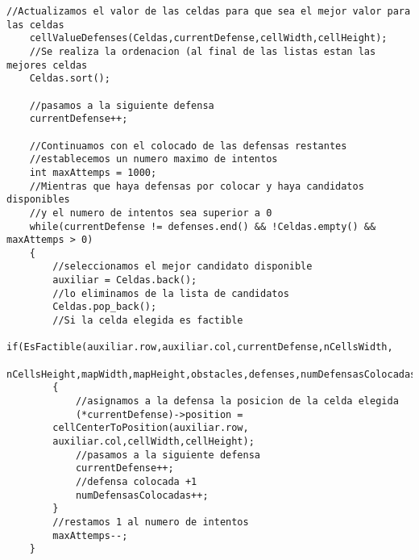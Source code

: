 \begin{lstlisting}[frame=single,basicstyle=\tiny,title={Voraz total}]
	//Actualizamos el valor de las celdas para que sea el mejor valor para las celdas
	cellValueDefenses(Celdas,currentDefense,cellWidth,cellHeight); 
	//Se realiza la ordenacion (al final de las listas estan las mejores celdas
	Celdas.sort();
	
	//pasamos a la siguiente defensa
	currentDefense++; 

	//Continuamos con el colocado de las defensas restantes
	//establecemos un numero maximo de intentos
	int maxAttemps = 1000;
	//Mientras que haya defensas por colocar y haya candidatos disponibles 
	//y el numero de intentos sea superior a 0
    while(currentDefense != defenses.end() && !Celdas.empty() && maxAttemps > 0) 
    {	 
		//seleccionamos el mejor candidato disponible
		auxiliar = Celdas.back(); 
		//lo eliminamos de la lista de candidatos
		Celdas.pop_back();
		//Si la celda elegida es factible
    	if(EsFactible(auxiliar.row,auxiliar.col,currentDefense,nCellsWidth,
	nCellsHeight,mapWidth,mapHeight,obstacles,defenses,numDefensasColocadas)) 
    	{
			//asignamos a la defensa la posicion de la celda elegida
        	(*currentDefense)->position = 
		cellCenterToPosition(auxiliar.row,
		auxiliar.col,cellWidth,cellHeight); 
			//pasamos a la siguiente defensa
			currentDefense++; 
			//defensa colocada +1
			numDefensasColocadas++; 
    	}
		//restamos 1 al numero de intentos
		maxAttemps--; 
    }

	
\end{lstlisting}
